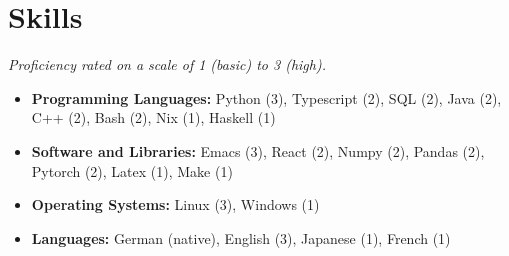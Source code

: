 \documentclass[letterpaper,10pt]{article}
\begin{document}
	\section*{Skills}
	\noindent\small\textit{Proficiency rated on a scale of 1 (basic) to 3 (high).}
	\normalsize
	\begin{itemize}
		\item \textbf{Programming Languages:} Python (3), Typescript (2), SQL (2), Java (2), C++ (2), Bash (2), Nix (1), Haskell (1)
		\item \textbf{Software and Libraries:} Emacs (3), React (2), Numpy (2), Pandas (2), Pytorch (2), Latex (1), Make (1)
		\item \textbf{Operating Systems:} Linux (3), Windows (1)
		\item \textbf{Languages:} German (native), English (3), Japanese (1), French (1)
	\end{itemize}
\end{document}
